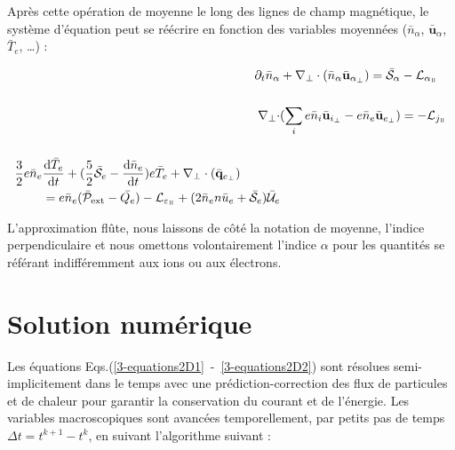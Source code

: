 \begin{refsection}
Après cette opération de moyenne le long des lignes de champ magnétique, le
système d'équation peut se réécrire en fonction des variables moyennées ($\bar{n}_\alpha$, $\bar{\mathbf
u}_\alpha$, $\bar{T}_e$, \ldots) :

\begin{align}
\label{3-equations2D1}
\partial_t \bar{n}_\alpha& +
\nabla_\perp\cdot\left(\bar{n}_\alpha\bar{\mathbf{u}}_{\alpha_\perp}\right)=\bar{\mathcal{S}}_\alpha
- \mathcal{L}_{\alpha_\para}\\[0.5cm]
\nabla_\perp\cdot&(\sum_ie\bar{n}_i\bar{\mathbf{u}}_{i_\perp}
-e\bar{n}_e\bar{\mathbf{u}}_{e_\perp})= - \mathcal{L}_{j_\para}\\[0.5cm]
\begin{split}\frac{3}{2}e\bar{n}_e&\frac{\text{d}\bar{T}_e}{\text{d}t} +
(\frac{5}{2}\bar{\mathcal{S}}_e
-\frac{\text{d}\bar{n}_e}{\text{d}t})e\bar{T}_e+\nabla_\perp\cdot(\bar{\mathbf{q}}_{e_\perp})\\
&=e\bar{n}_e(\bar{\mathcal{P}}_\text{ext}-\bar{Q_e})-\mathcal{L}_{\varepsilon_\para}
+(2\bar{n}_en\bar{u}_e+\bar{\mathcal{S}}_e)\bar{\mathcal{U}}_e
\label{3-equations2D2}
\end{split}
\end{align}

L'approximation flûte, nous laissons de côté la notation de moyenne, l'indice
perpendiculaire et nous omettons volontairement l'indice $\alpha$ pour les
quantités se référant indifféremment aux ions ou aux électrons.

\section{Solution numérique}

Les équations Eqs.(\ref{3-equations2D1}~-~\ref{3-equations2D2}) sont résolues
semi-implicitement dans le temps avec une prédiction-correction des flux de
particules et de chaleur pour garantir la conservation du courant et de
l'énergie. Les variables macroscopiques sont avancées temporellement, par
petits pas de temps $\Delta t=t^{k+1}-t^k$, en suivant l'algorithme suivant :


\end{refsection}
